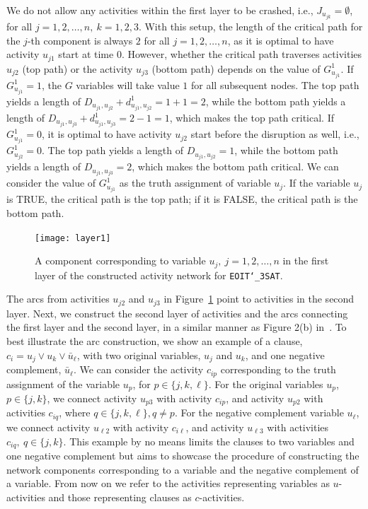 \documentclass[11pt]{article}
\newcommand{\noi}{\noindent}
\begin{document}
	We do not allow any activities within the first layer to be crashed, i.e., \(J_{u_{jk}} = \emptyset\), for all \(j = 1,2,\dots, n,\ k = 1,2,3\). With this setup, the length of the critical path for the \(j\)-th component is always \(2\) for all \(j = 1,2,\dots,n\), as it is optimal to have activity \(u_{j1}\) start at time \(0\). However, whether the critical path traverses activities \(u_{j2}\) (top path) or the activity \(u_{j3}\) (bottom path) depends on the value of \(G^1_{u_{j1}}\). If \(G^1_{u_{j1}} = 1\), the \(G\) variables will take value \(1\) for all subsequent nodes. The top path yields a length of \(D_{u_{j1},u_{j2}} + d^1_{u_{j1},u_{j2}} = 1 + 1 = 2\), while the bottom path yields a length of \(D_{u_{j1},u_{j3}} + d^1_{u_{j1},u_{j3}} = 2 - 1 = 1\), which makes the top path critical. If \(G^1_{u_{j1}} = 0\), it is optimal to have activity \(u_{j2}\) start before the disruption as well, i.e., \(G^1_{u_{j2}} = 0\). The top path yields a length of \(D_{u_{j1},u_{j2}} = 1\), while the bottom path yields a length of \(D_{u_{j1},u_{j3}} = 2\), which makes the bottom path critical. We can consider the value of \(G^1_{u_{j1}}\) as the truth assignment of variable \(u_j\). If the variable \(u_j\) is TRUE, the critical path is the top path; if it is FALSE, the critical path is the bottom path. 
	\begin{figure}[H]
		\centering
		\texttt{[image: layer1]}
		\caption{A component corresponding to variable \(u_j,\ j = 1,2,\dots, n\) in the first layer of the constructed activity network for \texttt{EOIT\char`_3SAT}.}
		\label{fig:layer1}
	\end{figure}
	\noi The arcs from activities \(u_{j2}\) and \(u_{j3}\) in Figure~\ref{fig:layer1} point to activities in the second layer. Next, we construct the second layer of activities and the arcs connecting the first layer and the second layer, in a similar manner as Figure 2(b) in~\cite{de1997complexity}. To best illustrate the arc construction, we show an example of a clause, \(c_i = u_j \vee u_k \vee \bar{u}_{\ell}\), with two original variables, \(u_j\) and \(u_k\), and one negative complement, \(\bar{u}_{\ell}\). We can consider the activity \(c_{ip}\) corresponding to the truth assignment of the variable \(u_p\), for \(p \in \{j,k,\ell\}\). For the original variables \(u_p\), \(p \in \{j,k\}\), we connect activity \(u_{p3}\) with activity \(c_{ip}\), and activity \(u_{p2}\) with activities \(c_{iq}\), where \(q \in \{j,k,\ell\}, q \neq p\). For the negative complement variable \(u_\ell\), we connect activity \(u_{\ell 2}\) with activity \(c_{i \ell}\), and activity \(u_{\ell 3}\) with activities \(c_{iq},\ q \in \{j,k\}\). This example by no means limits the clauses to two variables and one negative complement but aims to showcase the procedure of constructing the network components corresponding to a variable and the negative complement of a variable. From now on we refer to the activities representing variables as \(u\)-activities and those representing clauses as \(c\)-activities.\\
\end{document}
